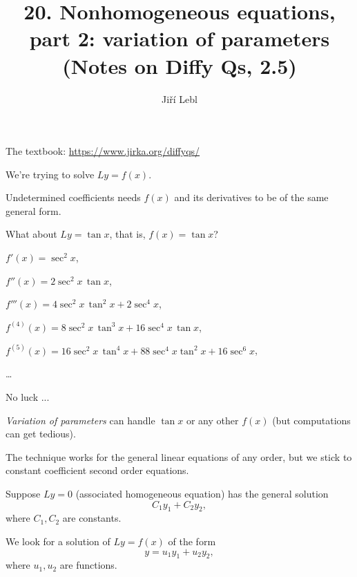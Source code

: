\documentclass[10pt,aspectratio=169]{beamer}
\author{Ji\v{r}\'i Lebl}
\institute[OSU]{%
Oklahoma State University%
}
\title{20. Nonhomogeneous equations,\\part 2: variation of parameters\\(Notes on Diffy Qs, 2.5)}
\date{}
\begin{document}
\begin{frame}
\titlepage


\begin{center}
The textbook: \url{https://www.jirka.org/diffyqs/}
\end{center}
\end{frame}

\begin{frame}
We're trying to solve $Ly = f(x)$.

\medskip
\pause

Undetermined coefficients needs $f(x)$ and its derivatives
to be of the same general form.

\medskip
\pause

What about $Ly = \tan x$, that is, $f(x) = \tan x$?

\medskip
\pause

$f'(x) = \sec^2 x$,

\pause
$f''(x) = 2\sec^2 x \, \tan x$,

\pause
$f'''(x) = 4 \sec^2 x \, \tan^2 x + 2 \sec^4 x$,

\pause
$f^{(4)}(x) = 8 \sec^2 x \, \tan^3 x + 16 \sec^4 x \, \tan x$,

\pause
$f^{(5)}(x) = 16\sec^2 x \, \tan^4 x + 88 \sec^4 x \tan^2 x + 16 \sec^6 x$,

\ldots

\medskip
\pause

No luck ...

\end{frame}

\begin{frame}
\emph{Variation of parameters} can handle $\tan x$ or any other $f(x)$ (but
computations can get tedious).

\medskip
\pause

The technique works for the general linear equations of any order,
but we stick to constant coefficient second order equations.

\medskip
\pause

Suppose $Ly= 0$ (associated homogeneous equation) has the general
solution
\[
C_1 y_1 + C_2 y_2 ,
\]
where $C_1,C_2$ are constants.

\medskip
\pause

We look for a solution of $Ly=f(x)$ of the form
\[
y  = u_1 y_1 + u_2 y_2 ,
\]
where $u_1,u_2$ are functions.

\end{frame}
\end{document}
